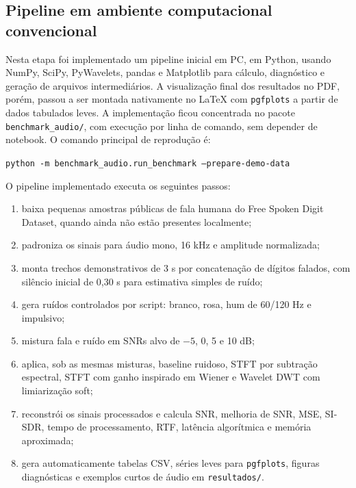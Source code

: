 \subsection{Pipeline em ambiente computacional convencional}

Nesta etapa foi implementado um pipeline inicial em PC, em Python, usando NumPy, SciPy, PyWavelets, pandas e Matplotlib para cálculo, diagnóstico e geração de arquivos intermediários. A visualização final dos resultados no PDF, porém, passou a ser montada nativamente no LaTeX com \texttt{pgfplots} a partir de dados tabulados leves. A implementação ficou concentrada no pacote \texttt{benchmark\_audio/}, com execução por linha de comando, sem depender de notebook. O comando principal de reprodução é:

\begin{center}
\texttt{python -m benchmark\_audio.run\_benchmark --prepare-demo-data}
\end{center}

O pipeline implementado executa os seguintes passos:

\begin{enumerate}
    \item baixa pequenas amostras públicas de fala humana do Free Spoken Digit Dataset, quando ainda não estão presentes localmente;
    \item padroniza os sinais para áudio mono, 16 kHz e amplitude normalizada;
    \item monta trechos demonstrativos de 3 s por concatenação de dígitos falados, com silêncio inicial de 0,30 s para estimativa simples de ruído;
    \item gera ruídos controlados por script: branco, rosa, hum de 60/120 Hz e impulsivo;
    \item mistura fala e ruído em SNRs alvo de \(-5\), 0, 5 e 10 dB;
    \item aplica, sob as mesmas misturas, baseline ruidoso, STFT por subtração espectral, STFT com ganho inspirado em Wiener e Wavelet DWT com limiarização soft;
    \item reconstrói os sinais processados e calcula SNR, melhoria de SNR, MSE, SI-SDR, tempo de processamento, RTF, latência algorítmica e memória aproximada;
    \item gera automaticamente tabelas CSV, séries leves para \texttt{pgfplots}, figuras diagnósticas e exemplos curtos de áudio em \texttt{resultados/}.
\end{enumerate}

